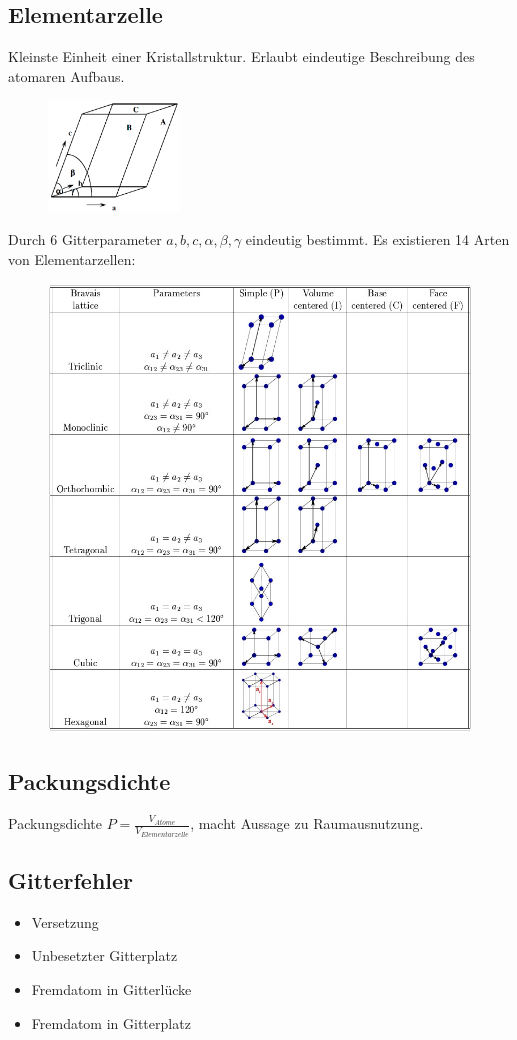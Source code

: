 \subsection{Elementarzelle}
Kleinste Einheit einer Kristallstruktur. Erlaubt eindeutige Beschreibung des atomaren Aufbaus. \\

\begin{figure}[htbp]
	\includegraphics[width=3.5cm]{images/1_Elementarzelle.png}
\end{figure}
Durch 6 Gitterparameter $a,b,c,\alpha,\beta,\gamma$ eindeutig bestimmt. Es existieren 14 Arten von Elementarzellen: \\

\begin{figure}[htbp]
	\includegraphics[width=\linewidth]{images/1_Kristallstrukturen.png}
\end{figure}


\subsection{Packungsdichte}
Packungsdichte $P = \frac{V_{Atome}}{V_{Elementarzelle}}$, macht Aussage zu Raumausnutzung.

\subsection{Gitterfehler}
\begin{itemize}
	\item Versetzung
	\item Unbesetzter Gitterplatz
	\item Fremdatom in Gitterlücke
	\item Fremdatom in Gitterplatz
\end{itemize}